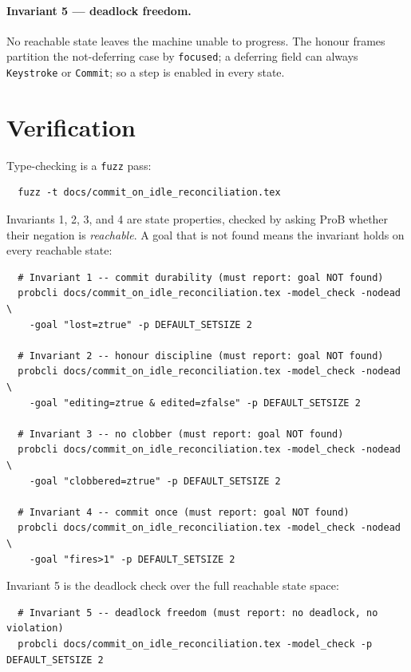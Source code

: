 \documentclass[a4paper,10pt,fleqn]{article}
\begin{document}
\paragraph{Invariant 5 --- deadlock freedom.}
No reachable state leaves the machine unable to progress.  The honour frames
partition the not-deferring case by \texttt{focused}; a deferring field can
always \texttt{Keystroke} or \texttt{Commit}; so a step is enabled in every
state.

\section{Verification}
\label{sec:verify}

Type-checking is a \texttt{fuzz} pass:
\begin{verbatim}
  fuzz -t docs/commit_on_idle_reconciliation.tex
\end{verbatim}

Invariants 1, 2, 3, and 4 are state properties, checked by asking ProB whether
their negation is \emph{reachable}.  A goal that is not found means the invariant
holds on every reachable state:
\begin{verbatim}
  # Invariant 1 -- commit durability (must report: goal NOT found)
  probcli docs/commit_on_idle_reconciliation.tex -model_check -nodead \
    -goal "lost=ztrue" -p DEFAULT_SETSIZE 2

  # Invariant 2 -- honour discipline (must report: goal NOT found)
  probcli docs/commit_on_idle_reconciliation.tex -model_check -nodead \
    -goal "editing=ztrue & edited=zfalse" -p DEFAULT_SETSIZE 2

  # Invariant 3 -- no clobber (must report: goal NOT found)
  probcli docs/commit_on_idle_reconciliation.tex -model_check -nodead \
    -goal "clobbered=ztrue" -p DEFAULT_SETSIZE 2

  # Invariant 4 -- commit once (must report: goal NOT found)
  probcli docs/commit_on_idle_reconciliation.tex -model_check -nodead \
    -goal "fires>1" -p DEFAULT_SETSIZE 2
\end{verbatim}

Invariant 5 is the deadlock check over the full reachable state space:
\begin{verbatim}
  # Invariant 5 -- deadlock freedom (must report: no deadlock, no violation)
  probcli docs/commit_on_idle_reconciliation.tex -model_check -p DEFAULT_SETSIZE 2
\end{verbatim}
\end{document}

